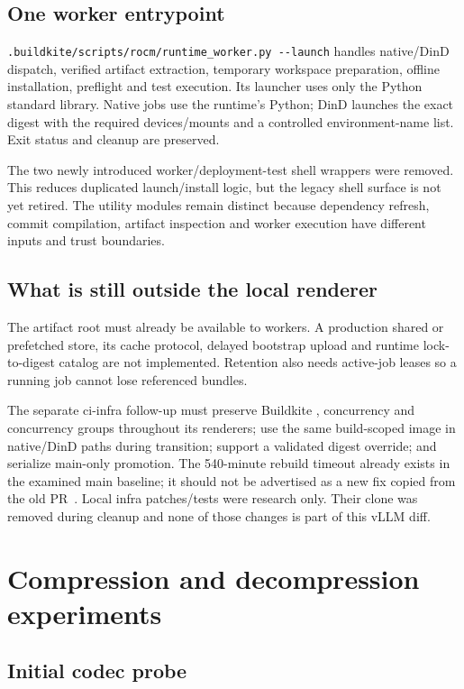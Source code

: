 \documentclass[11pt,a4paper]{article}
\newcommand{\file}[1]{\nolinkurl{#1}}
\newcommand{\term}[1]{\texttt{\detokenize{#1}}}
\begin{document}
\subsection{One worker entrypoint}

\file{.buildkite/scripts/rocm/runtime_worker.py --launch} handles native/DinD
dispatch, verified artifact extraction, temporary workspace preparation, offline
installation, preflight and test execution. Its launcher uses only the Python
standard library. Native jobs use the runtime's Python; DinD launches the exact
digest with the required devices/mounts and a controlled environment-name list.
Exit status and cleanup are preserved.

The two newly introduced worker/deployment-test shell wrappers were removed.
This reduces duplicated launch/install logic, but the legacy shell surface is
not yet retired. The utility modules remain distinct because dependency refresh,
commit compilation, artifact inspection and worker execution have different
inputs and trust boundaries.

\subsection{What is still outside the local renderer}

The artifact root must already be available to workers. A production shared or
prefetched store, its cache protocol, delayed bootstrap upload and runtime
lock-to-digest catalog are not implemented. Retention also needs active-job leases
so a running job cannot lose referenced bundles.

The separate ci-infra follow-up must preserve Buildkite \term{if}, concurrency
and concurrency groups throughout its renderers; use the same build-scoped image
in native/DinD paths during transition; support a validated digest override; and
serialize main-only promotion. The 540-minute rebuild timeout already exists in
the examined main baseline; it should not be advertised as a new fix copied from
the old PR~\cite{infra}. Local infra patches/tests were research only. Their clone
was removed during cleanup and none of those changes is part of this vLLM diff.

\section{Compression and decompression experiments}

\subsection{Initial codec probe}
\end{document}
